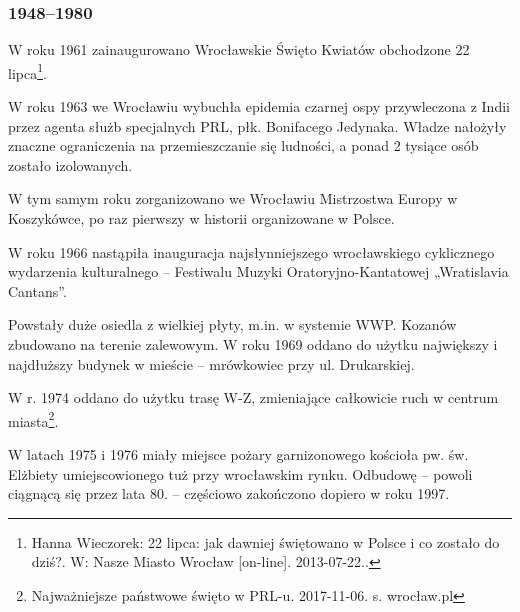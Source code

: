 \documentclass{article}
\begin{document}
\subsubsection{1948–1980}
W roku 1961 zainaugurowano Wrocławskie Święto Kwiatów obchodzone 22 lipca\footnote{Hanna Wieczorek: 22 lipca: jak dawniej świętowano w Polsce i co zostało do dziś?. W: Nasze Miasto Wrocław [on-line]. 2013-07-22..}.

W roku 1963 we Wrocławiu wybuchła epidemia czarnej ospy przywleczona z Indii przez agenta służb specjalnych PRL, płk. Bonifacego Jedynaka. Władze nałożyły znaczne ograniczenia na przemieszczanie się ludności, a ponad 2 tysiące osób zostało izolowanych.

W tym samym roku zorganizowano we Wrocławiu Mistrzostwa Europy w Koszykówce, po raz pierwszy w historii organizowane w Polsce.

W roku 1966 nastąpiła inauguracja najsłynniejszego wrocławskiego cyklicznego wydarzenia kulturalnego – Festiwalu Muzyki Oratoryjno-Kantatowej „Wratislavia Cantans”.

Powstały duże osiedla z wielkiej płyty, m.in. w systemie WWP. Kozanów zbudowano na terenie zalewowym. W roku 1969 oddano do użytku największy i najdłuższy budynek w mieście – mrówkowiec przy ul. Drukarskiej.

W r. 1974 oddano do użytku trasę W-Z, zmieniające całkowicie ruch w centrum miasta\footnote{Najważniejsze państwowe święto w PRL-u. 2017-11-06. s. wrocław.pl}.

W latach 1975 i 1976 miały miejsce pożary garnizonowego kościoła pw. św. Elżbiety umiejscowionego tuż przy wrocławskim rynku. Odbudowę – powoli ciągnącą się przez lata 80. – częściowo zakończono dopiero w roku 1997.
\end{document}
